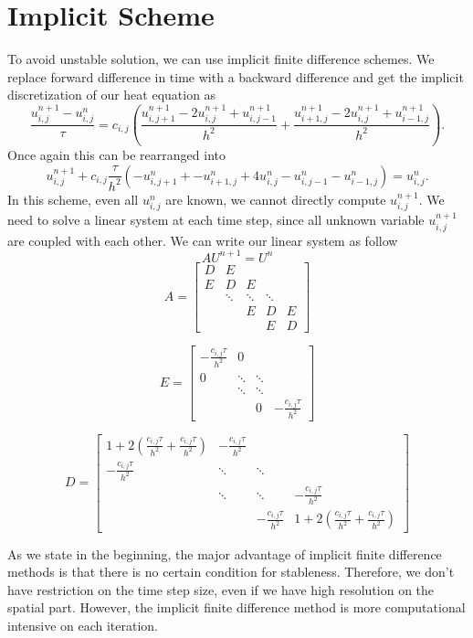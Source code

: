 \documentclass[10pt,a4paper]{report}
\begin{document}
\section{Implicit Scheme}
To avoid unstable solution, we can use implicit finite difference schemes. We replace forward difference in time with a backward difference and get the implicit discretization of our heat equation as \[{\frac{u^{n+1}_{i,j}-u^n_{i,j}}{\tau}}=c_{i,j}({\frac{u^{n+1}_{i,j+1}-2u^{n+1}_{i,j}+u^{n+1}_{i,j-1}}{h^2}}+{\frac{u^{n+1}_{i+1,j}-2u^{n+1}_{i,j}+u^{n+1}_{i-1,j}}{h^2}}).\]
Once again this can be rearranged into
\[u^{n+1}_{i,j}+c_{i,j}{\frac{\tau}{h^2}}(-u^n_{i,j+1}+-u^n_{i+1,j}+4u^n_{i,j}-u^n_{i,j-1}-u^n_{i-1,j})=u^{n}_{i,j}.\]
In this scheme, even all $u^n_{i,j}$ are known, we cannot directly compute $u^{n+1}_{i,j} $. We need to solve a linear system at each time step, since all unknown variable $u^{n+1}_{i,j}$ are coupled with each other. We can write our linear system as follow \[AU^{n+1}=U^{n}\] 
\[A=\begin{bmatrix}
D & E &   &   &   \\
E & D & E &   &   \\
  & \ddots & \ddots &\ddots & \\
  &   & E & D & E \\
  &   &   & E & D    
\end{bmatrix}
\]

\[E=\begin{bmatrix}
-{\frac{c_{i,j}\tau}{h^2}} & 0 & & \\
0 & \ddots & \ddots & \\
  & \ddots & \ddots & \\
  &        & 0 & -{\frac{c_{i,j}\tau}{h^2}}  
\end{bmatrix}
\]

\[D=\begin{bmatrix}
1+2({\frac{c_{i,j}\tau}{h^2}}+{\frac{c_{i,j}\tau}{h^2}}) & -{\frac{c_{i,j}\tau}{h^2}} & &  \\
-{\frac{c_{i,j}\tau}{h^2}} & \ddots & \ddots & \\
& \ddots & \ddots & -{\frac{c_{i,j}\tau}{h^2}}\\
 &  & -{\frac{c_{i,j}\tau}{h^2}} & 1+2({\frac{c_{i,j}\tau}{h^2}}+{\frac{c_{i,j}\tau}{h^2}})
\end{bmatrix}
\]


As we state in the beginning, the major advantage of implicit finite difference methods is that there is no certain condition for stableness. Therefore, we don't have restriction on the time step size, even if we have high resolution on the spatial part. However, the implicit finite difference method is more computational intensive on each iteration. 
\end{document}
